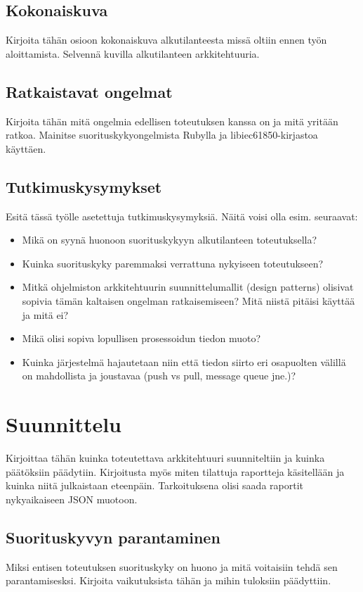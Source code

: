 \documentclass[globalnumbering,centeredcaptions,draftfooter]{tutthesis} %
\begin{document}
\section{Kokonaiskuva}
Kirjoita tähän osioon kokonaiskuva alkutilanteesta missä oltiin ennen työn aloittamista. Selvennä kuvilla alkutilanteen arkkitehtuuria.

\section{Ratkaistavat ongelmat}
Kirjoita tähän mitä ongelmia edellisen toteutuksen kanssa on ja mitä yritään ratkoa. Mainitse suorituskykyongelmista Rubylla ja libiec61850-kirjastoa käyttäen.

\section{Tutkimuskysymykset}
Esitä tässä työlle asetettuja tutkimuskysymyksiä. Näitä voisi olla esim. seuraavat:
\begin{itemize}
	\item Mikä on syynä huonoon suorituskykyyn alkutilanteen toteutuksella?
	\item Kuinka suorituskyky paremmaksi verrattuna nykyiseen toteutukseen?
	\item Mitkä ohjelmiston arkkitehtuurin suunnittelumallit (design patterns) olisivat sopivia tämän kaltaisen ongelman ratkaisemiseen? Mitä niistä pitäisi käyttää ja mitä ei?
	\item Mikä olisi sopiva lopullisen prosessoidun tiedon muoto?
	\item Kuinka järjestelmä hajautetaan niin että tiedon siirto eri osapuolten välillä on mahdollista ja joustavaa (push vs pull, message queue jne.)?
\end{itemize}


\chapter{Suunnittelu}
\label{ch:suunnittelu}
Kirjoittaa tähän kuinka toteutettava arkkitehtuuri suunniteltiin ja kuinka päätöksiin päädytiin. Kirjoitusta myös miten tilattuja raportteja käsitellään ja kuinka niitä julkaistaan eteenpäin. Tarkoituksena olisi saada raportit nykyaikaiseen JSON muotoon.

\section{Suorituskyvyn parantaminen}
Miksi entisen toteutuksen suorituskyky on huono ja mitä voitaisiin tehdä sen parantamisesksi. Kirjoita vaikutuksista tähän ja mihin tuloksiin päädyttiin.
\end{document}
